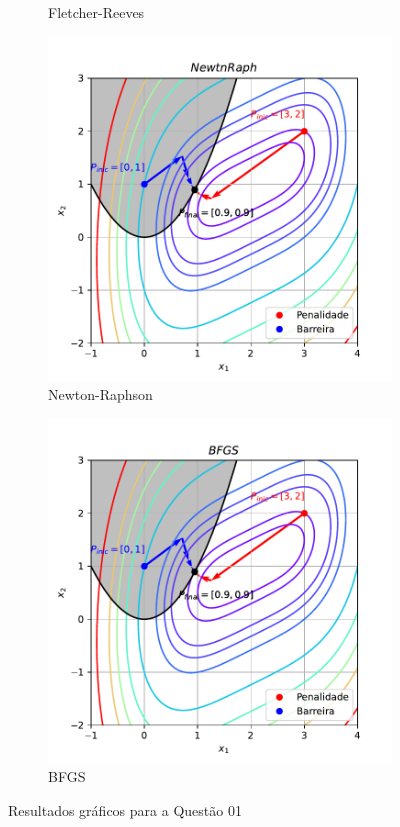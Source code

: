 \documentclass[10pt, a4paper]{article}
\begin{document}
\begin{figure}[htpb]
\begin{subfigure}[b]{0.32\textwidth}
    \caption{Fletcher-Reeves}
    \label{fig:q1_fletchrvs}
  \end{subfigure}
  \hfill
  \begin{subfigure}[b]{0.32\textwidth}
    \centering
    \includegraphics[width=\textwidth]{images/q1_NewtnRaph.pdf}
    \caption{Newton-Raphson}
    \label{fig:q1_newtnraph}
  \end{subfigure}
  \hfill
  \begin{subfigure}[b]{0.32\textwidth}
    \centering
    \includegraphics[width=\textwidth]{images/q1_BFGS.pdf}
    \caption{BFGS}
    \label{fig:q1_bfgs}
  \end{subfigure}
     \caption{Resultados gráficos para a Questão 01}
     \label{fig:q1}
\end{figure}
\end{document}
